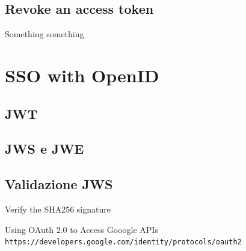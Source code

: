 \documentclass{style}
\begin{document}
\subsection{Revoke an access token}
Something something

\section{SSO with OpenID}
\subsection{JWT}
\subsection{JWS e JWE}
\subsection{Validazione JWS}
Verify the SHA256 signature

\begin{thebibliography}{9}
    Using OAuth 2.0 to Access Gooogle APIs
    \\\texttt{https://developers.google.com/identity/protocols/oauth2}
\end{thebibliography}

\newpage
\end{document}
